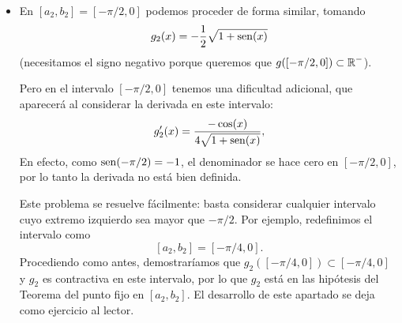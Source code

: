 \begin{example}
\begin{itemize}
  \item En $[a_2,b_2]=[-\pi/2,0]$ podemos proceder de forma similar,
    tomando $$g_2(x)=-\frac 12 \sqrt{1+\operatorname{sen}(x)}$$
    (necesitamos el signo
    negativo porque queremos que $g([-\pi/2,0])\subset\operatorname{{\mathbb R}}^{-}$).

    Pero en el intervalo $[-\pi/2,0]$ tenemos una dificultad
    adicional, que aparecerá al considerar la derivada en este
    intervalo:
    $$
    g_2'(x)=\frac{-\cos(x)}{4\sqrt{1+\operatorname{sen}(x)}},
    $$
    En efecto, como $\operatorname{sen}(-\pi/2)=-1$, el denominador se hace cero en
    $[-\pi/2,0]$, por lo tanto la derivada no está bien definida.

    Este problema se resuelve fácilmente: basta considerar cualquier
    intervalo cuyo extremo izquierdo sea mayor que $-\pi/2$. Por
    ejemplo, redefinimos el intervalo como
    $$[a_2,b_2]=[-\pi/4,0].$$
    Procediendo como antes, demostraríamos que
    $g_2([-\pi/4,0])\subset[-\pi/4,0]$ y $g_2$ es contractiva en este
    intervalo, por lo que $g_2$ está en las hipótesis del Teorema del
    punto fijo en $[a_2,b_2]$. El desarrollo de este apartado se deja
    como ejercicio al lector.
  \end{itemize}


\end{example}

